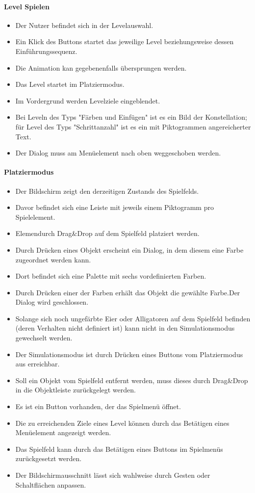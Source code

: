 \paragraph{Level Spielen}
\begin{itemize}
\item Der Nutzer befindet sich in der Levelauswahl.
\item Ein Klick des Buttons startet das jeweilige Level beziehungsweise dessen Einführungssequenz. 
\item Die Animation kan gegebenenfalls übersprungen werden.
\item Das Level startet im Platziermodus.
\item Im Vordergrund werden Levelziele eingeblendet.
\item Bei Leveln des Typs "Färben und Einfügen"  ist es ein Bild der Konstellation; für Level des Typs "Schrittanzahl" ist es ein mit Piktogrammen angereicherter Text.
\item Der Dialog muss am Menüelement nach oben weggeschoben werden. 
\end{itemize}


\paragraph{Platziermodus}
\begin{itemize}  
\item Der Bildschirm zeigt den derzeitigen Zustands des Spielfelds.
\item Davor befindet sich eine Leiste mit jeweils einem Piktogramm pro Spielelement.
\item Elemendurch Drag\&Drop auf dem Spielfeld platziert werden. 
\item  Durch Drücken eines Objekt erscheint 
ein Dialog, in dem diesem eine Farbe zugeordnet werden kann.
\item Dort befindet sich eine Palette mit sechs vordefinierten Farben.
\item Durch Drücken einer der Farben erhält das Objekt die gewählte Farbe.Der Dialog wird geschlossen.
\item Solange sich noch ungefärbte Eier oder Alligatoren auf dem Spielfeld befinden (deren Verhalten
nicht definiert ist) kann nicht in den Simulationsmodus gewechselt werden.
\item Der Simulationsmodus ist durch Drücken eines Buttons vom Platziermodus
aus erreichbar.
\item Soll ein Objekt vom Spielfeld entfernt werden, muss dieses durch Drag\&Drop
in die Objektleiste zurückgelegt werden.
\item Es ist ein Button vorhanden, der das Spielmenü öffnet.
\item Die zu erreichenden Ziele eines Level können durch das Betätigen eines Menüelement angezeigt werden.
\item Das Spielfeld kann durch das Betätigen eines Buttons im Spielmenüs zurückgesetzt werden.
\item Der Bildschirmausschnitt lässt sich wahlweise durch Gesten oder Schaltflächen anpassen.
\end{itemize}

